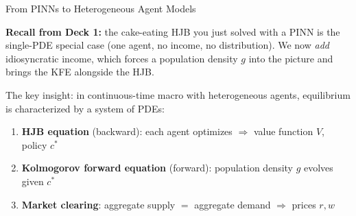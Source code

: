 \documentclass[aspectratio=169,11pt]{beamer}
\newcommand{\emphc}[1]{\textcolor{harvardcrimson}{#1}}
\begin{document}
\begin{frame}{From PINNs to Heterogeneous Agent Models}
\begin{center}
\end{center}

\vspace{0.8em}
{\footnotesize\textbf{Recall from Deck 1:} the cake-eating HJB you just solved with a PINN is the single-PDE special case (one agent, no income, no distribution). We now \emph{add} idiosyncratic income, which forces a population density $g$ into the picture and brings the KFE alongside the HJB.}

\vspace{0.4em}
The key insight: in continuous-time macro with heterogeneous agents, \emphc{equilibrium} is characterized by a system of PDEs:
\begin{enumerate}\itemsep2pt
    \item \textbf{HJB equation} (backward): each agent optimizes $\Rightarrow$ value function $V$, policy $c^*$
    \item \textbf{Kolmogorov forward equation} (forward): population density $g$ evolves given $c^*$
    \item \textbf{Market clearing}: aggregate supply $=$ aggregate demand $\Rightarrow$ prices $r, w$
\end{enumerate}
\end{frame}
\end{document}
